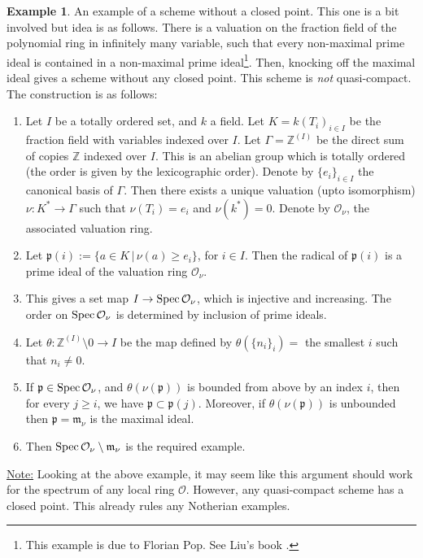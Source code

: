 \documentclass[11pt]{amsart}
\newcommand{\Spec}{{\rm Spec \,}}
\newcommand{\sO}{{\mathcal O}}
\newcommand{\Z}{{\mathbb Z}}
\theoremstyle{definition}
\newtheorem{example}[theorem]{Example}
\begin{document}
\begin{example}
	\label{example-no-closed-point}
	An example of a scheme without a closed point. This one is a bit involved but idea is as follows. There is a valuation on the fraction field of the polynomial ring in infinitely many variable, such that every non-maximal prime ideal is contained in a non-maximal prime ideal\footnote{This example is due to Florian Pop. See Liu's book \cite[\S 3.3, Exercise 3.27]{Liu}.}. Then, knocking off the maximal ideal gives a scheme without any closed point. This scheme is \textit{not} quasi-compact. The construction is as follows:
\begin{enumerate}
	\item Let $I$ be a totally ordered set, and $k$ a field. Let $K=k(T_i)_{i\in I}$ be the fraction field with variables indexed over $I$. Let $\Gamma = \Z^{(I)}$ be the direct sum of copies $\Z$ indexed over $I$. This is an abelian group which is totally ordered (the order is given by the lexicographic order). Denote by $\lbrace e_i \rbrace_{i\in I}$ the canonical basis of $\Gamma$. Then there exists a unique valuation (upto isomorphism) $\nu : K^*\rightarrow \Gamma$ such that $\nu(T_i)=e_i$ and $\nu(k^*)=0$. Denote by $\sO_{\nu}$, the associated valuation ring.
	\item Let $\mathfrak{p}(i):=\lbrace a\in K \,|\, \nu (a)\geq e_i \rbrace$, for $i\in I$. Then the radical of $\mathfrak{p}(i)$ is a prime ideal of the valuation ring $\sO_{\nu}$.
	\item This gives a set map $I \rightarrow \Spec\sO_{\nu}$, which is injective and increasing. The order on $\Spec\sO_{\nu}$ is determined by inclusion of prime ideals.
	\item Let $\theta:\Z^{(I)}\setminus 0\rightarrow I$ be the map defined by  $\theta(\lbrace n_i\rbrace_i)=$ the smallest $i$ such that $n_i\neq 0$.
	\item If $\mathfrak{p}\in \Spec\sO_{\nu}$, and $\theta(\nu(\mathfrak{p}))$ is bounded from above by an index $i$, then for every $j\geq i$, we have $\mathfrak{p}\subset \mathfrak{p}(j)$. Moreover, if $\theta(\nu(\mathfrak{p}))$ is unbounded then $\mathfrak{p}=\mathfrak{m}_{\nu}$ is the maximal ideal.
	\item Then $\Spec\sO_{\nu}\setminus \mathfrak{m}_{\nu}$ is the required example.
\end{enumerate}
	
\end{example}

\underline{Note:} Looking at the above example, it may seem like this argument should work for the spectrum of any local ring $\sO$. However, any quasi-compact scheme has a closed point. This already rules any Notherian examples.
\end{document}
